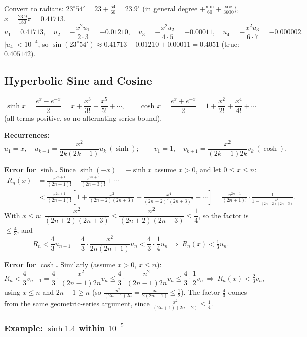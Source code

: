 \documentclass[hidelinks]{article}
\newcommand{\abs}[1]{\left|#1\right|}
\begin{document}
Convert to radians: $23^\circ54'=23+\tfrac{54}{60}=23.9^\circ$ (in general degree $+\frac{\text{min}}{60}+\frac{\text{sec}}{3600}$), $x=\frac{23.9}{180}\pi=0.41713$.
\[
u_1=0.41713,\quad u_2=-\frac{x^2u_1}{2\cdot3}=-0.01210,\quad u_3=-\frac{x^2u_2}{4\cdot5}=+0.00011,\quad u_4=-\frac{x^2u_3}{6\cdot7}=-0.000002 .
\]
$\abs{u_4}<10^{-4}$, so $\sin(23^\circ54')\approx0.41713-0.01210+0.00011=0.4051$ (true: $0.405142$).

\subsection{Hyperbolic Sine and Cosine}

\[
\sinh x=\frac{e^x-e^{-x}}2=x+\frac{x^3}{3!}+\frac{x^5}{5!}+\cdots,\qquad
\cosh x=\frac{e^x+e^{-x}}2=1+\frac{x^2}{2!}+\frac{x^4}{4!}+\cdots
\]
(all terms positive, so no alternating-series bound).

\textbf{Recurrences:}
\[
u_1=x,\quad u_{k+1}=\frac{x^2}{2k(2k+1)}u_k\ (\sinh);\qquad
v_1=1,\quad v_{k+1}=\frac{x^2}{(2k-1)2k}v_k\ (\cosh).
\]

\textbf{Error for $\sinh$.} Since $\sinh(-x)=-\sinh x$ assume $x>0$, and let $0\le x\le n$:
\[
\begin{aligned}
R_n(x)&=\frac{x^{2n+1}}{(2n+1)!}+\frac{x^{2n+3}}{(2n+3)!}+\cdots\\
&<\frac{x^{2n+1}}{(2n+1)!}\left[1+\frac{x^2}{(2n+2)(2n+3)}+\frac{x^4}{(2n+2)^2(2n+3)^2}+\cdots\right]
=\frac{x^{2n+1}}{(2n+1)!}\cdot\frac{1}{1-\frac{x^2}{(2n+2)(2n+3)}} .
\end{aligned}
\]
With $x\le n$: $\dfrac{x^2}{(2n+2)(2n+3)}\le\dfrac{n^2}{(2n+2)(2n+3)}\le\dfrac14$, so the factor is $\le\frac43$, and
\[
R_n<\frac43u_{n+1}=\frac43\cdot\frac{x^2}{2n(2n+1)}u_n<\frac43\cdot\frac14u_n\ \Longrightarrow\ \boxed{R_n(x)<\tfrac13u_n}.
\]

\textbf{Error for $\cosh$.} Similarly (assume $x>0$, $x\le n$):
\[
R_n<\frac43v_{n+1}=\frac43\cdot\frac{x^2}{(2n-1)2n}v_n\le\frac43\cdot\frac{n^2}{(2n-1)2n}v_n\le\frac43\cdot\frac12v_n\ \Longrightarrow\ \boxed{R_n(x)<\tfrac23v_n},
\]
using $x\le n$ and $2n-1\ge n$ (so $\frac{n^2}{(2n-1)2n}=\frac{n}{2(2n-1)}\le\frac12$). The factor $\frac43$ comes from the same geometric-series argument, since $\frac{x^2}{(2n+1)(2n+2)}\le\frac14$.

\subsubsection{Example: $\sinh1.4$ within $10^{-5}$}
\end{document}

